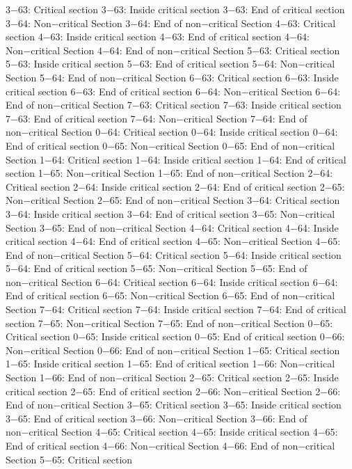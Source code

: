 3−63: Critical section
3−63: Inside critical section
3−63: End of critical section
3−64: Non−critical Section
3−64: End of non−critical Section
4−63: Critical section
4−63: Inside critical section
4−63: End of critical section
4−64: Non−critical Section
4−64: End of non−critical Section
5−63: Critical section
5−63: Inside critical section
5−63: End of critical section
5−64: Non−critical Section
5−64: End of non−critical Section
6−63: Critical section
6−63: Inside critical section
6−63: End of critical section
6−64: Non−critical Section
6−64: End of non−critical Section
7−63: Critical section
7−63: Inside critical section
7−63: End of critical section
7−64: Non−critical Section
7−64: End of non−critical Section
0−64: Critical section
0−64: Inside critical section
0−64: End of critical section
0−65: Non−critical Section
0−65: End of non−critical Section
1−64: Critical section
1−64: Inside critical section
1−64: End of critical section
1−65: Non−critical Section
1−65: End of non−critical Section
2−64: Critical section
2−64: Inside critical section
2−64: End of critical section
2−65: Non−critical Section
2−65: End of non−critical Section
3−64: Critical section
3−64: Inside critical section
3−64: End of critical section
3−65: Non−critical Section
3−65: End of non−critical Section
4−64: Critical section
4−64: Inside critical section
4−64: End of critical section
4−65: Non−critical Section
4−65: End of non−critical Section
5−64: Critical section
5−64: Inside critical section
5−64: End of critical section
5−65: Non−critical Section
5−65: End of non−critical Section
6−64: Critical section
6−64: Inside critical section
6−64: End of critical section
6−65: Non−critical Section
6−65: End of non−critical Section
7−64: Critical section
7−64: Inside critical section
7−64: End of critical section
7−65: Non−critical Section
7−65: End of non−critical Section
0−65: Critical section
0−65: Inside critical section
0−65: End of critical section
0−66: Non−critical Section
0−66: End of non−critical Section
1−65: Critical section
1−65: Inside critical section
1−65: End of critical section
1−66: Non−critical Section
1−66: End of non−critical Section
2−65: Critical section
2−65: Inside critical section
2−65: End of critical section
2−66: Non−critical Section
2−66: End of non−critical Section
3−65: Critical section
3−65: Inside critical section
3−65: End of critical section
3−66: Non−critical Section
3−66: End of non−critical Section
4−65: Critical section
4−65: Inside critical section
4−65: End of critical section
4−66: Non−critical Section
4−66: End of non−critical Section
5−65: Critical section
